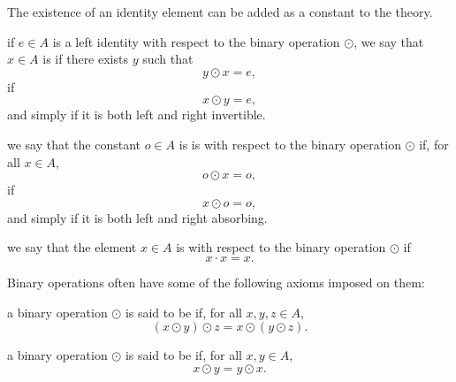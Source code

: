 \begin{definition}
\begin{defenum}
    The existence of an identity element can be added as a constant to the theory.

     if \( e \in A \) is a left identity with respect to the binary operation \( \odot \), we say that \( x \in A \) is  if there exists \( y \) such that
    \begin{equation*}
      y \odot x = e,
    \end{equation*}
     if
    \begin{equation*}
      x \odot y = e,
    \end{equation*}
    and simply  if it is both left and right invertible. 

     we say that the constant  \( o \in A \) is is  with respect to the binary operation \( \odot \) if, for all \( x \in A \),
    \begin{equation*}
      o \odot x = o,
    \end{equation*}
     if
    \begin{equation*}
      x \odot o = o,
    \end{equation*}
    and simply  if it is both left and right absorbing.

     we say that the element \( x \in A \) is  with respect to the binary operation \( \odot \) if
    \begin{equation*}
      x \cdot x = x.
    \end{equation*}
  \end{defenum}

  Binary operations often have some of the following axioms imposed on them:
  \begin{defenum}
     a binary operation \( \odot \) is said to be  if, for all \( x, y, z \in A \),
    \begin{equation*}
      (x \odot y) \odot z = x \odot (y \odot z).
    \end{equation*}

     a binary operation \( \odot \) is said to be  if, for all \( x, y \in A \),
    \begin{equation*}
      x \odot y = y \odot x.
    \end{equation*}


\end{defenum}
\end{definition}
